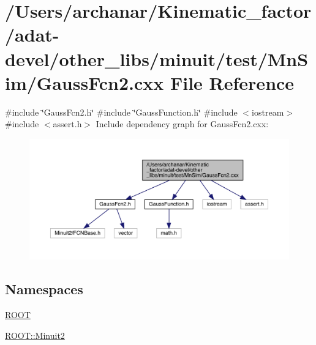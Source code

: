 \hypertarget{adat-devel_2other__libs_2minuit_2test_2MnSim_2GaussFcn2_8cxx}{}\section{/\+Users/archanar/\+Kinematic\+\_\+factor/adat-\/devel/other\+\_\+libs/minuit/test/\+Mn\+Sim/\+Gauss\+Fcn2.cxx File Reference}
\label{adat-devel_2other__libs_2minuit_2test_2MnSim_2GaussFcn2_8cxx}
{\ttfamily \#include \char`\"{}Gauss\+Fcn2.\+h\char`\"{}}\newline
{\ttfamily \#include \char`\"{}Gauss\+Function.\+h\char`\"{}}\newline
{\ttfamily \#include $<$iostream$>$}\newline
{\ttfamily \#include $<$assert.\+h$>$}\newline
Include dependency graph for Gauss\+Fcn2.\+cxx\+:
\nopagebreak
\begin{figure}[H]
\begin{center}
\leavevmode
\includegraphics[width=350pt]{d1/d95/adat-devel_2other__libs_2minuit_2test_2MnSim_2GaussFcn2_8cxx__incl}
\end{center}
\end{figure}
\subsection*{Namespaces}
\begin{DoxyCompactItemize}
\item 
 \mbox{\hyperlink{namespaceROOT}{R\+O\+OT}}
\item 
 \mbox{\hyperlink{namespaceROOT_1_1Minuit2}{R\+O\+O\+T\+::\+Minuit2}}
\end{DoxyCompactItemize}
